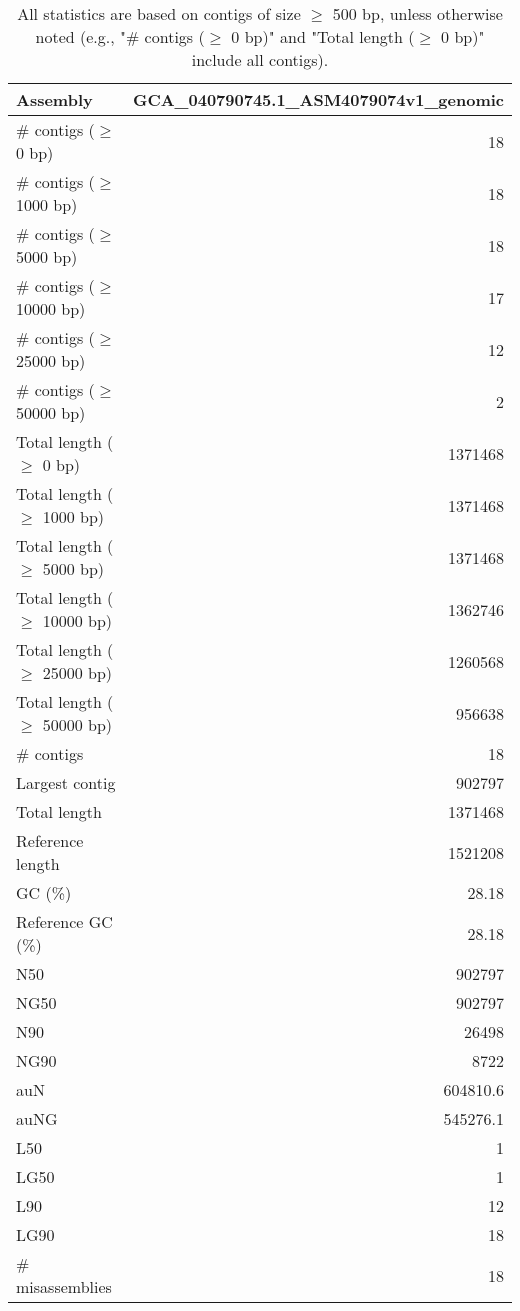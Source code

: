 \documentclass[12pt,a4paper]{article}
\begin{document}
\begin{table}[ht]
\begin{center}
\caption{All statistics are based on contigs of size $\geq$ 500 bp, unless otherwise noted (e.g., "\# contigs ($\geq$ 0 bp)" and "Total length ($\geq$ 0 bp)" include all contigs).}
\begin{tabular}{|l*{1}{|r}|}
\hline
Assembly & GCA\_040790745.1\_ASM4079074v1\_genomic \\ \hline
\# contigs ($\geq$ 0 bp) & 18 \\ \hline
\# contigs ($\geq$ 1000 bp) & 18 \\ \hline
\# contigs ($\geq$ 5000 bp) & 18 \\ \hline
\# contigs ($\geq$ 10000 bp) & 17 \\ \hline
\# contigs ($\geq$ 25000 bp) & 12 \\ \hline
\# contigs ($\geq$ 50000 bp) & 2 \\ \hline
Total length ($\geq$ 0 bp) & 1371468 \\ \hline
Total length ($\geq$ 1000 bp) & 1371468 \\ \hline
Total length ($\geq$ 5000 bp) & 1371468 \\ \hline
Total length ($\geq$ 10000 bp) & 1362746 \\ \hline
Total length ($\geq$ 25000 bp) & 1260568 \\ \hline
Total length ($\geq$ 50000 bp) & 956638 \\ \hline
\# contigs & 18 \\ \hline
Largest contig & 902797 \\ \hline
Total length & 1371468 \\ \hline
Reference length & 1521208 \\ \hline
GC (\%) & 28.18 \\ \hline
Reference GC (\%) & 28.18 \\ \hline
N50 & 902797 \\ \hline
NG50 & 902797 \\ \hline
N90 & 26498 \\ \hline
NG90 & 8722 \\ \hline
auN & 604810.6 \\ \hline
auNG & 545276.1 \\ \hline
L50 & 1 \\ \hline
LG50 & 1 \\ \hline
L90 & 12 \\ \hline
LG90 & 18 \\ \hline
\# misassemblies & 18 \\ \hline

\end{tabular}
\end{center}
\end{table}
\end{document}
